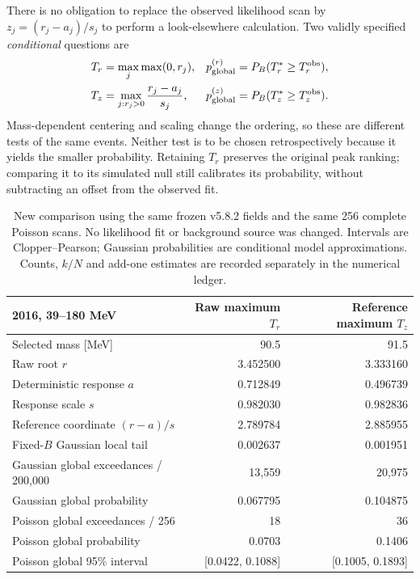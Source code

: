 There is no obligation to replace the observed likelihood scan by
$z_j=(r_j-a_j)/s_j$ to perform a look-elsewhere calculation. Two validly specified
\emph{conditional} questions are
\begin{align}
 T_r&=\max_j\max(0,r_j), &p_{\rm global}^{(r)}&=P_B(T_r^*\ge T_r^{\rm obs}),\\
 T_z&=\max_{j:r_j>0}\frac{r_j-a_j}{s_j},
 &p_{\rm global}^{(z)}&=P_B(T_z^*\ge T_z^{\rm obs}).
\end{align}
Mass-dependent centering and scaling change the ordering, so these are different
tests of the same events. Neither test is to be chosen retrospectively because
it yields the smaller probability. Retaining $T_r$ preserves the original
peak ranking; comparing it to its simulated null still calibrates its
probability, without subtracting an offset from the observed fit.

\begin{table}[htbp]\centering\small
\begin{tabular}{lrr}
\hline
2016, 39--180 MeV & Raw maximum $T_r$ & Reference maximum $T_z$\\
\hline
Selected mass [MeV] &90.5&91.5\\
Raw root $r$ &3.452500&3.333160\\
Deterministic response $a$ &0.712849&0.496739\\
Response scale $s$ &0.982030&0.982836\\
Reference coordinate $(r-a)/s$ &2.789784&2.885955\\
Fixed-$B$ Gaussian local tail &0.002637&0.001951\\
Gaussian global exceedances / 200,000 &13,559&20,975\\
Gaussian global probability &0.067795&0.104875\\
Poisson global exceedances / 256 &18&36\\
Poisson global probability &0.0703&0.1406\\
Poisson global 95\% interval &[0.0422, 0.1088]&[0.1005, 0.1893]\\
\hline
\end{tabular}
\caption{New comparison using the same frozen v5.8.2 fields and the same 256
complete Poisson scans. No likelihood fit or background source was changed.
Intervals are Clopper--Pearson; Gaussian probabilities are conditional model
approximations. Counts, $k/N$ and add-one estimates are recorded separately in
the numerical ledger.}
\label{tab:raw-reference-statistics}
\end{table}

